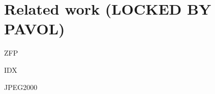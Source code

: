 \section{Related work (LOCKED BY PAVOL)}
ZFP~\cite{zfp2014}

IDX~\cite{idx2001}

JPEG2000~\cite{jpeg2001}
